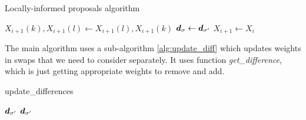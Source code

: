 \begin{algorithm}[!htb]
	\caption{Locally-informed proposals algorithm}\label{alg:loc_neigh}
	\begin{algorithmic}[1]
		
			
			
			
				\State $X_{i+1}(k), X_{i+1}(l) \gets X_{i+1}(l), X_{i+1}(k)$
				\State $\bm{d}_{\sigma} \gets \bm{d}_{\sigma'}$
			\Else
				\State $X_{i+1} \gets X_i$
			\EndIf
		\EndFor
	\end{algorithmic}
\end{algorithm}
		
The main algorithm uses a sub-algorithm \ref{alg:update_diff} which updates weights in swaps that we need to consider separately. It uses function \textit{get\_difference}, which is just getting appropriate weights to remove and add. 

\begin{algorithm}[!htb]
	\caption{update\_differences}\label{alg:update_diff}
	\begin{algorithmic}[1]
		\Require $\bm{d}_{\sigma'}$
		\Ensure $\bm{d}_{\sigma'}$
			\EndFor
		\EndFor
		
			\EndFor
		\EndFor
	\end{algorithmic}
\end{algorithm}